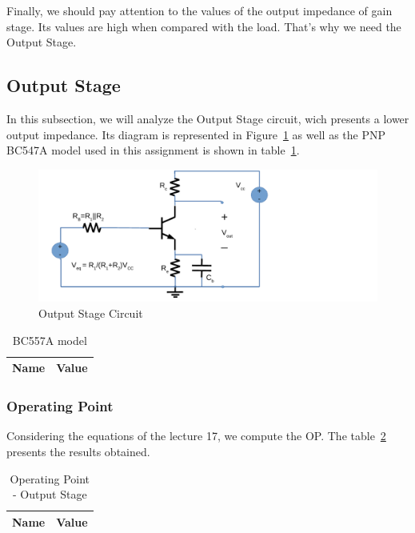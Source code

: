 Finally, we should pay attention to the values of the output impedance of gain stage. Its values are high when compared with the load. That's why we need the Output Stage.
\subsection{Output Stage}
In this subsection, we will analyze the Output Stage circuit, wich presents a lower output impedance. Its diagram is represented in Figure~\ref{fig:oscircuit} as well as the PNP BC547A model used in this assignment is shown in table~\ref{tab:modelos}.

\begin{figure}[H] \centering
\includegraphics[width=0.8\linewidth]{outstage.pdf}
\caption{Output Stage Circuit}                                     %
\label{fig:oscircuit}
\end{figure}

\begin{table}[H]
  \centering
  \begin{tabular}{|l|r|}
     \hline    
    {\bf Name} & {\bf Value} \\ \hline   
    
  \end{tabular}
  \caption{BC557A model}
  \label{tab:modelos}
\end{table}

\subsubsection{Operating Point}
Considering the equations of the lecture 17, we compute the OP. The table~\ref{tab:osop} presents the results obtained.

\begin{table}[H]
  \centering
  \begin{tabular}{|l|r|}
     \hline    
    {\bf Name} & {\bf Value} \\ \hline   
    
  \end{tabular}
  \caption{Operating Point - Output Stage}
  \label{tab:osop}
\end{table}

